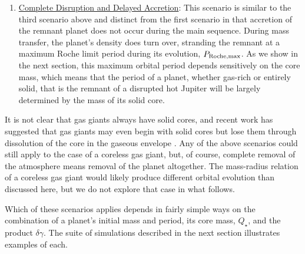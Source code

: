 \documentclass{svjour3}                     %
\begin{document}
\begin{enumerate}
\item \underline{Complete Disruption and Delayed Accretion}: This scenario is similar to the third scenario above and distinct from the first scenario in that accretion of the remnant planet does not occur during the main sequence. During mass transfer, the planet's density does turn over, stranding the remnant at a maximum Roche limit period during its evolution, $P_{\rm Roche, max}$. As we show in the next section, this maximum orbital period depends sensitively on the core mass, which means that the period of a planet, whether gas-rich or entirely solid, that is the remnant of a disrupted hot Jupiter will be largely determined by the mass of its solid core. 

\end{enumerate}

It is not clear that gas giants always have solid cores, and recent work has suggested that gas giants may even begin with solid cores but lose them through dissolution of the core in the gaseous envelope \cite{2012ApJ...745...54W}. Any of the above scenarios could still apply to the case of a coreless gas giant, but, of course, complete removal of the atmosphere means removal of the planet altogether. The mass-radius relation of a coreless gas giant would likely produce different orbital evolution than discussed here, but we do not explore that case in what follows. 

Which of these scenarios applies depends in fairly simple ways on the combination of a planet's initial mass and period, its core mass, $Q_\star$, and the product $\delta \gamma$. The suite of simulations described in the next section illustrates examples of each.
\end{document}
